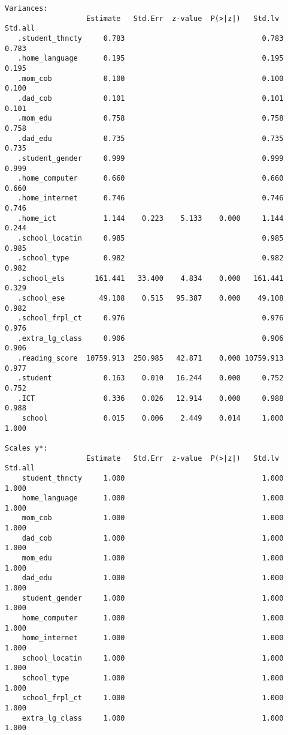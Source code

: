 \documentclass[
]{article}
\begin{document}
\begin{verbatim}
Variances:
                   Estimate   Std.Err  z-value  P(>|z|)   Std.lv   Std.all
   .student_thncty     0.783                                0.783    0.783
   .home_language      0.195                                0.195    0.195
   .mom_cob            0.100                                0.100    0.100
   .dad_cob            0.101                                0.101    0.101
   .mom_edu            0.758                                0.758    0.758
   .dad_edu            0.735                                0.735    0.735
   .student_gender     0.999                                0.999    0.999
   .home_computer      0.660                                0.660    0.660
   .home_internet      0.746                                0.746    0.746
   .home_ict           1.144    0.223    5.133    0.000     1.144    0.244
   .school_locatin     0.985                                0.985    0.985
   .school_type        0.982                                0.982    0.982
   .school_els       161.441   33.400    4.834    0.000   161.441    0.329
   .school_ese        49.108    0.515   95.387    0.000    49.108    0.982
   .school_frpl_ct     0.976                                0.976    0.976
   .extra_lg_class     0.906                                0.906    0.906
   .reading_score  10759.913  250.985   42.871    0.000 10759.913    0.977
   .student            0.163    0.010   16.244    0.000     0.752    0.752
   .ICT                0.336    0.026   12.914    0.000     0.988    0.988
    school             0.015    0.006    2.449    0.014     1.000    1.000

Scales y*:
                   Estimate   Std.Err  z-value  P(>|z|)   Std.lv   Std.all
    student_thncty     1.000                                1.000    1.000
    home_language      1.000                                1.000    1.000
    mom_cob            1.000                                1.000    1.000
    dad_cob            1.000                                1.000    1.000
    mom_edu            1.000                                1.000    1.000
    dad_edu            1.000                                1.000    1.000
    student_gender     1.000                                1.000    1.000
    home_computer      1.000                                1.000    1.000
    home_internet      1.000                                1.000    1.000
    school_locatin     1.000                                1.000    1.000
    school_type        1.000                                1.000    1.000
    school_frpl_ct     1.000                                1.000    1.000
    extra_lg_class     1.000                                1.000    1.000


\end{verbatim}
\end{document}
